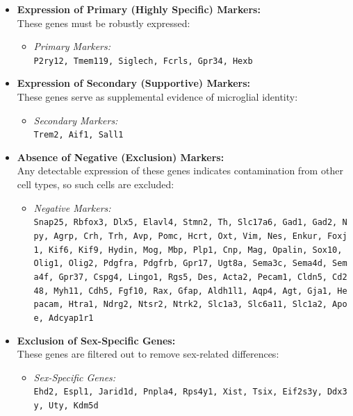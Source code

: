 \documentclass[
  letterpaper,
  DIV=11,
  numbers=noendperiod]{scrartcl}
\providecommand{\tightlist}{%
  \setlength{\itemsep}{0pt}\setlength{\parskip}{0pt}}\usepackage{longtable,booktabs,array}
\begin{document}
\begin{itemize}
\tightlist
\item
  \textbf{Expression of Primary (Highly Specific) Markers:}\\
  These genes must be robustly expressed:

  \begin{itemize}
  \tightlist
  \item
    \emph{Primary Markers:}\\
    \texttt{P2ry12,\ Tmem119,\ Siglech,\ Fcrls,\ Gpr34,\ Hexb}
  \end{itemize}
\item
  \textbf{Expression of Secondary (Supportive) Markers:}\\
  These genes serve as supplemental evidence of microglial identity:

  \begin{itemize}
  \tightlist
  \item
    \emph{Secondary Markers:}\\
    \texttt{Trem2,\ Aif1,\ Sall1}
  \end{itemize}
\item
  \textbf{Absence of Negative (Exclusion) Markers:}\\
  Any detectable expression of these genes indicates contamination from
  other cell types, so such cells are excluded:

  \begin{itemize}
  \tightlist
  \item
    \emph{Negative Markers:}\\
    \texttt{Snap25,\ Rbfox3,\ Dlx5,\ Elavl4,\ Stmn2,\ Th,\ Slc17a6,\ Gad1,\ Gad2,\ Npy,\ Agrp,\ Crh,\ Trh,\ Avp,\ Pomc,\ Hcrt,\ Oxt,\ Vim,\ Nes,\ Enkur,\ Foxj1,\ Kif6,\ Kif9,\ Hydin,\ Mog,\ Mbp,\ Plp1,\ Cnp,\ Mag,\ Opalin,\ Sox10,\ Olig1,\ Olig2,\ Pdgfra,\ Pdgfrb,\ Gpr17,\ Ugt8a,\ Sema3c,\ Sema4d,\ Sema4f,\ Gpr37,\ Cspg4,\ Lingo1,\ Rgs5,\ Des,\ Acta2,\ Pecam1,\ Cldn5,\ Cd248,\ Myh11,\ Cdh5,\ Fgf10,\ Rax,\ Gfap,\ Aldh1l1,\ Aqp4,\ Agt,\ Gja1,\ Hepacam,\ Htra1,\ Ndrg2,\ Ntsr2,\ Ntrk2,\ Slc1a3,\ Slc6a11,\ Slc1a2,\ Apoe,\ Adcyap1r1}
  \end{itemize}
\item
  \textbf{Exclusion of Sex-Specific Genes:}\\
  These genes are filtered out to remove sex-related differences:

  \begin{itemize}
  \tightlist
  \item
    \emph{Sex-Specific Genes:}\\
    \texttt{Ehd2,\ Espl1,\ Jarid1d,\ Pnpla4,\ Rps4y1,\ Xist,\ Tsix,\ Eif2s3y,\ Ddx3y,\ Uty,\ Kdm5d}
  \end{itemize}
\end{itemize}
\end{document}
